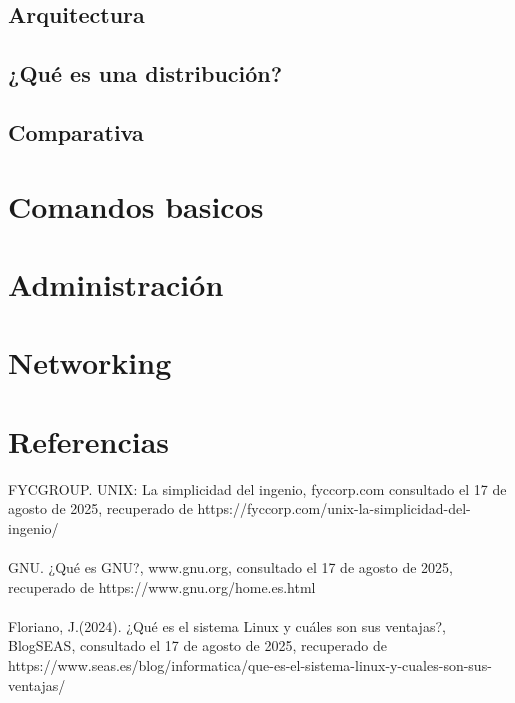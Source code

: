 \documentclass[10pt,a4paper,titlepage]{article}
\begin{document}
	\subsection*{Arquitectura}
	
	\subsection*{¿Qué es una distribución?}
	
	\subsection*{Comparativa}
	
	\section*{Comandos basicos}
	
	\section*{Administración}
	
	\section*{Networking}
	
	\section*{Referencias}
	FYCGROUP. UNIX: La simplicidad del ingenio, fyccorp.com consultado el 17 de agosto de 2025, recuperado de https://fyccorp.com/unix-la-simplicidad-del-ingenio/	
	\\
	\\
	GNU. ¿Qué es GNU?, www.gnu.org, consultado el 17 de agosto de 2025, recuperado de https://www.gnu.org/home.es.html
	\\
	\\
	Floriano, J.(2024). ¿Qué es el sistema Linux y cuáles son sus ventajas?, BlogSEAS, consultado el 17 de agosto de 2025, recuperado de https://www.seas.es/blog/informatica/que-es-el-sistema-linux-y-cuales-son-sus-ventajas/
	
\end{document}
